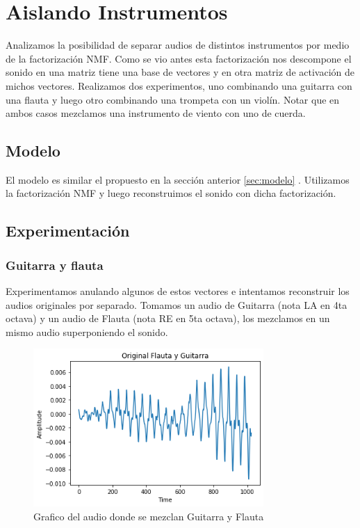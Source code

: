 \section{Aislando Instrumentos}

Analizamos la posibilidad de separar audios de distintos instrumentos por medio de la factorizaci\'on NMF. Como se vio antes esta factorizaci\'on nos descompone el sonido en una matriz tiene una base de vectores y en otra matriz de activaci\'on de michos vectores. Realizamos dos experimentos, uno combinando una guitarra con una flauta y luego otro combinando una trompeta con un violín. Notar que en ambos casos mezclamos una instrumento de viento con uno de cuerda.

\subsection{Modelo}

El modelo es similar el propuesto en la secci\'on anterior \ref{sec:modelo} . Utilizamos la factorizaci\'on NMF y luego reconstruimos el sonido con dicha factorizaci\'on.
 
\subsection{Experimentaci\'on}

\subsubsection{Guitarra y flauta}

Experimentamos anulando algunos de estos vectores e intentamos reconstruir los audios originales por separado. Tomamos un audio de Guitarra (nota LA en 4ta octava) y un audio de Flauta (nota RE en 5ta octava), los mezclamos en un mismo audio superponiendo el sonido.

\begin{figure}[h!]
    \centering
    \includegraphics[height=60mm]{Content/Figures/separacion_original.png}
    \caption{Grafico del audio donde se mezclan Guitarra y Flauta}
\end{figure}

